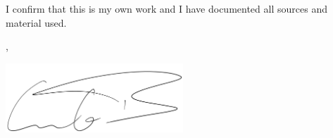 \thispagestyle{empty}

\vspace*{0.75\textheight}
\noindent
I confirm that this \MakeLowercase{\getDoctype{}} is my own work and I have documented all sources and material used.

\noindent
\begin{minipage}[t]{0.5\textwidth}
    \vspace{29mm}
    \raggedright
    \getSubmissionLocation{}, \getSubmissionDate{}
\end{minipage}%
\begin{minipage}[t]{0.5\textwidth}
    \vspace{10mm}
    \raggedleft
    \includegraphics[width=0.5\textwidth]{images/Signature.png} %

    \vspace{2mm}
    \noindent
    \getAuthor{}
\end{minipage}

\cleardoublepage{}